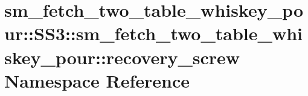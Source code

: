 \hypertarget{namespacesm__fetch__two__table__whiskey__pour_1_1SS3_1_1sm__fetch__two__table__whiskey__pour_1_1recovery__screw}{}\section{sm\+\_\+fetch\+\_\+two\+\_\+table\+\_\+whiskey\+\_\+pour\+:\+:S\+S3\+:\+:sm\+\_\+fetch\+\_\+two\+\_\+table\+\_\+whiskey\+\_\+pour\+:\+:recovery\+\_\+screw Namespace Reference}
\label{namespacesm__fetch__two__table__whiskey__pour_1_1SS3_1_1sm__fetch__two__table__whiskey__pour_1_1recovery__screw}
